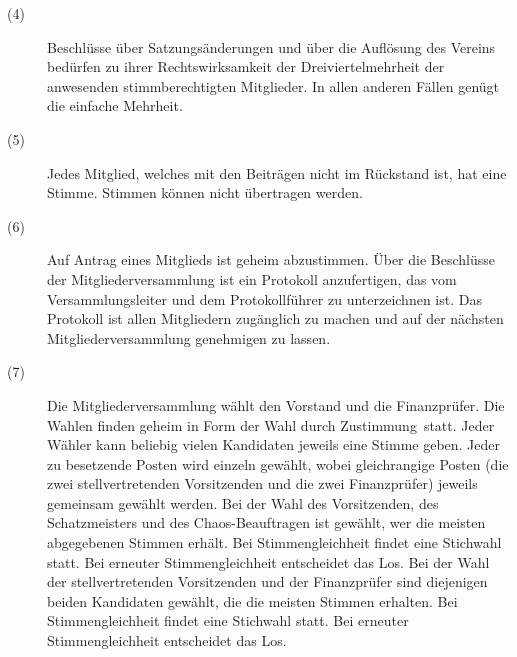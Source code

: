 \documentclass[12pt,paper=a4,ngerman]{scrreprt}
\begin{document}
\begin{description}
\item[(4)] Beschlüsse über Satzungsänderungen und über die Auflösung des Vereins bedürfen zu ihrer Rechtswirksamkeit der Dreiviertelmehrheit der anwesenden stimmberechtigten Mitglieder. In allen anderen Fällen genügt die einfache Mehrheit.
\item[(5)] Jedes Mitglied, welches mit den Beiträgen nicht im Rückstand ist, hat eine Stimme. Stimmen können nicht übertragen werden.
\item[(6)] Auf Antrag eines Mitglieds ist geheim abzustimmen. Über die Beschlüsse der Mitgliederversammlung ist ein Protokoll anzufertigen, das vom Versammlungsleiter und dem Protokollführer zu unterzeichnen ist. Das Protokoll ist allen Mitgliedern zugänglich zu machen und auf der nächsten Mitgliederversammlung genehmigen zu lassen.
\item[(7)] Die Mitgliederversammlung wählt den Vorstand und die Finanzprüfer. Die Wahlen finden geheim in Form der \glqq Wahl durch Zustimmung\grqq ~statt. Jeder Wähler kann beliebig vielen Kandidaten jeweils eine Stimme geben. Jeder zu besetzende Posten wird einzeln gewählt, wobei gleichrangige Posten (die zwei stellvertretenden Vorsitzenden und die zwei Finanzprüfer) jeweils gemeinsam gewählt werden. Bei der Wahl des Vorsitzenden, des Schatzmeisters und des Chaos-Beauftragen ist gewählt, wer die meisten abgegebenen Stimmen erhält. Bei Stimmengleichheit findet eine Stichwahl statt. Bei erneuter Stimmengleichheit entscheidet das Los. Bei der Wahl der stellvertretenden Vorsitzenden und der Finanzprüfer sind diejenigen beiden Kandidaten gewählt, die die meisten Stimmen erhalten. Bei Stimmengleichheit findet eine Stichwahl statt. Bei erneuter Stimmengleichheit entscheidet das Los.
\end{description}
\end{document}
